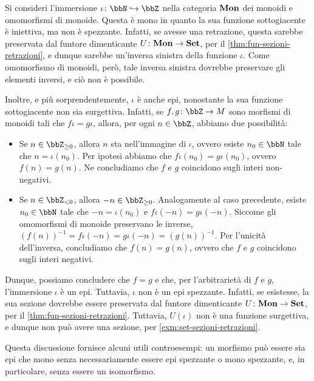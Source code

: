 \begin{example}
	Si consideri l'immersione \(\iota \colon \bbN \mono \bbZ\)
	nella categoria \(\mathbf{Mon}\) dei monoidi e omomorfismi di monoide.
	Questa è mono in quanto la sua funzione sottogiacente è iniettiva,
	ma non è spezzante.
	Infatti, se avesse una retrazione,
	questa sarebbe preservata dal funtore dimenticante \(U \colon \mathbf{Mon} \to \mathbf{Set}\),
	per il \autoref{thm:fun-sezioni-retrazioni},
	e dunque sarebbe un'inversa sinistra della funzione \(\iota\).
	Come omomorfismo di monoidi, però, tale inversa sinistra dovrebbe preservare gli elementi inversi,
	e ciò non è possibile.

	Inoltre, e più sorprendentemente, \(\iota\) è anche epi,
	nonostante la sua funzione sottogiacente non sia surgettiva.
	Infatti, se \(f, g \colon \bbZ \to M\) sono morfismi di monoidi tali che \(f \iota = g \iota\),
	allora, per ogni \(n \in \bbZ\),
	abbiamo due possibilità:
	\begin{itemize}
		\item Se \(n \in \bbZ_{\geq 0}\), allora \(n\) sta nell'immagine di \(\iota\),
		      ovvero esiste \(n_0 \in \bbN\) tale che \(n = \iota(n_0)\).
		      Per ipotesi abbiamo che \(f \iota (n_0) = g \iota (n_0)\),
		      ovvero \(f (n) = g (n)\).
		      Ne concludiamo che \(f\) e \(g\) coincidono sugli interi non-negativi.
		\item Se \(n \in \bbZ_{< 0}\), allora \(-n \in \bbZ_{\geq 0}\).
		      Analogamente al caso precedente, esiste \(n_0 \in \bbN\) tale che
		      \(-n = \iota(n_0)\) e \(f \iota (-n) = g \iota (-n)\).
		      Siccome gli omomorfismi di monoide preservano le inverse,
		      \({(f (n))}^{-1} = f \iota {(-n)} = g \iota {(-n)} = {(g (n))}^{-1}\).
		      Per l'unicità dell'inversa, concludiamo che \(f (n) = g (n)\),
		      ovvero che \(f\) e \(g\) coincidono sugli interi negativi.
	\end{itemize}
	Dunque, possiamo concludere che \(f = g\)
	e che, per l'arbitrarietà di \(f\) e \(g\),
	l'immersione \(\iota\) è un epi.
	Tuttavia, \(\iota\) non è un epi spezzante.
	Infatti, se esistesse, la sua sezione dovrebbe essere preservata dal funtore dimenticante \(U \colon \mathbf{Mon} \to \mathbf{Set}\),
	per il \autoref{thm:fun-sezioni-retrazioni}.
	Tuttavia, \(U(\iota)\) non è una funzione surgettiva,
	e dunque non può avere una sezione, per \autoref{exm:set-sezioni-retrazioni}.

	Questa discussione fornisce alcuni utili controesempi:
	un morfismo può essere sia epi che mono senza necessariamente essere epi spezzante o mono spezzante,
	e, in particolare, senza essere un isomorfismo.
\end{example}
